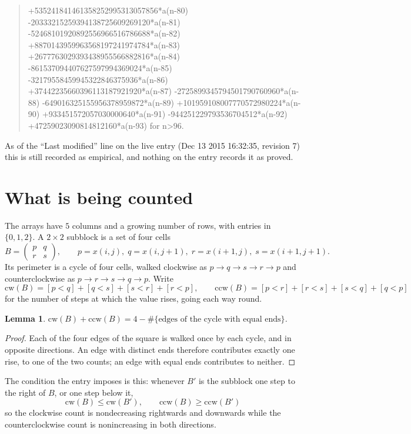 \documentclass[11pt,a4paper]{article}
\theoremstyle{plain}
\newtheorem{lemma}[theorem]{Lemma}
\theoremstyle{definition}
\begin{document}
\begin{quote}
+535241841461358252995313057856*a(n-80) -20333215259394138725609269120*a(n-81) -52468101920892556966516786688*a(n-82) +8870143959963568197241974784*a(n-83) +2677763029393438955566882816*a(n-84) -861537094407627597994369024*a(n-85) -32179558459945322846375936*a(n-86) +37442235660396113187921920*a(n-87) -2725899345794501790760960*a(n-88) -649016325155956378959872*a(n-89) +101959108007770572980224*a(n-90) +933451572057030000640*a(n-91) -944251229793536704512*a(n-92) +47259023090814812160*a(n-93) for n>96.
\end{quote}
As of the ``Last modified'' line on the live entry (Dec 13 2015 16:32:35, revision 7) this is still
recorded as empirical, and nothing on the entry records it as proved.

\section{What is being counted}

The arrays have $5$ columns and a growing number of rows, with entries in $\{0,1,2\}$. A
$2\times2$ subblock is a set of four cells
\[
B=\begin{pmatrix} p & q \\ r & s \end{pmatrix},
\qquad p=x(i,j),\; q=x(i,j+1),\; r=x(i+1,j),\; s=x(i+1,j+1).
\]
Its perimeter is a cycle of four cells, walked clockwise as $p\to q\to s\to r\to p$ and
counterclockwise as $p\to r\to s\to q\to p$. Write
\[
\mathrm{cw}(B)=[p<q]+[q<s]+[s<r]+[r<p],\qquad
\mathrm{ccw}(B)=[p<r]+[r<s]+[s<q]+[q<p]
\]
for the number of steps at which the value rises, going each way round.

\begin{lemma}\label{lem:sum}
$\mathrm{cw}(B)+\mathrm{ccw}(B)=4-\#\{\text{edges of the cycle with equal ends}\}$.
\end{lemma}

\begin{proof}
Each of the four edges of the square is walked once by each cycle, and in opposite directions.
An edge with distinct ends therefore contributes exactly one rise, to one of the two counts;
an edge with equal ends contributes to neither.
\end{proof}

The condition the entry imposes is this: whenever $B'$ is the subblock one step to the right of $B$, or one step below it, 
\[
\mathrm{cw}(B)\le\mathrm{cw}(B'),\qquad \mathrm{ccw}(B)\ge\mathrm{ccw}(B')
\]
so the clockwise count is nondecreasing rightwards and downwards while the counterclockwise count is nonincreasing in both directions.
\end{document}
